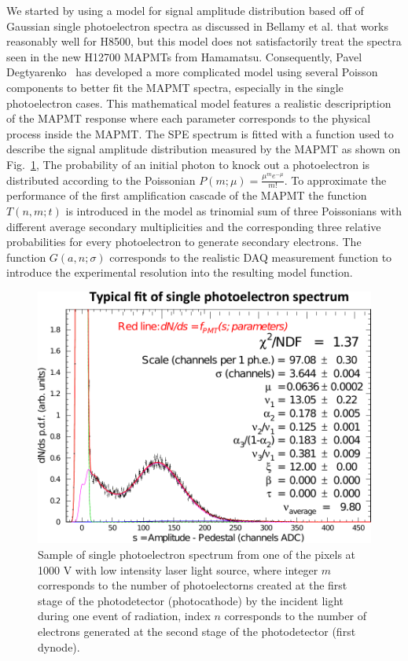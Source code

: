 \documentclass[5p,times,preprint]{elsarticle}
\begin{document}
We started by using a model for signal amplitude distribution based off of Gaussian single photoelectron spectra as discussed in Bellamy et al. that works reasonably well for H8500, but this model does not satisfactorily treat the spectra seen in the new H12700 MAPMTs from Hamamatsu. Consequently, Pavel Degtyarenko~\cite{DEGTIARENKO20171} has developed a more complicated model using several Poisson components to better fit the MAPMT spectra, especially in the single photoelectron cases.
This mathematical model features a realistic descripription of the MAPMT response where each parameter corresponds to the physical process inside the MAPMT.
The SPE spectrum is fitted with a function used to describe the signal amplitude distribution measured by the MAPMT as shown on Fig.~\ref{fig:SPEfit},
The probability of an initial photon to knock out a photoelectron is distributed according to the Poissonian $P(m;\mu)=\frac{\mu^me^{-\mu}}{m!}$.
To approximate the performance of the first amplification cascade of the MAPMT the function $T(n,m;t)$ is introduced in the model as trinomial sum of three Poissonians with different average secondary multiplicities and the corresponding three relative probabilities for every photoelectron to generate secondary electrons.
The function $G(a,n;\sigma)$ corresponds to the realistic DAQ measurement function to introduce the experimental resolution into the resulting model function.

\begin{figure}[bt]
	\centering
	\includegraphics[width=\linewidth]{SPEfit.pdf}
	\caption{Sample of single photoelectron spectrum from one of the pixels at 1000 V with low intensity laser light source,
where integer $m$ corresponds to the number of photoelectorns created at the first stage of the photodetector (photocathode) by the incident light during one event of radiation, index $n$ corresponds to the number of electrons generated at the second stage of the photodetector (first dynode).
}
	\label{fig:SPEfit}
\end{figure}
\end{document}
